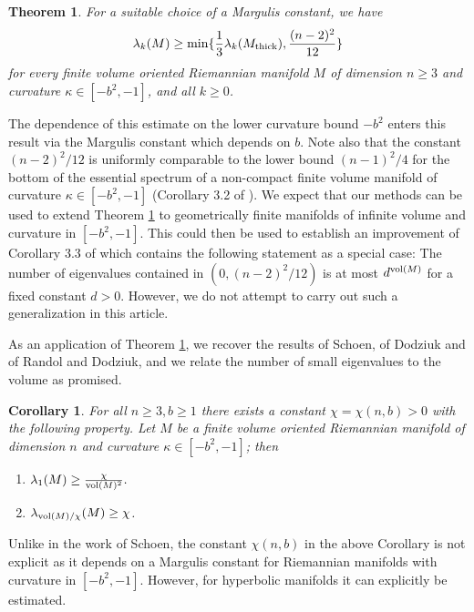 \documentclass[11pt]{amsart}
\theoremstyle{plain}
\theoremstyle{plain}
\newtheorem{thm}{Theorem}
\newtheorem*{cor}{Corollary}
\theoremstyle{definition}
\begin{document}
\begin{thm} \label{thm1}
For a suitable choice of a Margulis constant, we have 
\[\lambda_k(M)\geq \min\{\frac{1}{3}\lambda_k(M_{\rm thick}),\frac{(n-2)^2}{12}\}\]
for every finite volume oriented Riemannian manifold $M$ of dimension
$n\geq 3$ and curvature 
$\kappa\in [-b^2,-1]$, and all $k\geq 0$. 
\end{thm}


The dependence of this estimate 
on the lower curvature bound $-b^2$
enters this result via the Margulis constant which depends on $b$.
Note also that the constant $(n-2)^2/12$ is 
uniformly comparable to
the lower bound $(n-1)^2/4$ for  
the bottom of the essential spectrum of a non-compact
finite volume manifold of curvature $\kappa\in [-b^2,-1]$
(Corollary 3.2 of \cite{H04}). 
We expect that our methods can be used to extend
Theorem \ref{thm1} 
to geometrically finite manifolds of infinite volume and
curvature in $[-b^2,-1]$. This could then be used to establish
an improvement of Corollary 3.3 of \cite{H04} which contains
the following statement as a special case: 
The number of eigenvalues
contained in $(0,(n-2)^2/12)$ is at most $d^{{\rm vol}(M)}$ for a fixed 
constant $d>0$. However, we do not attempt to carry 
out such a generalization in this article. 

As an application of Theorem \ref{thm1}, we recover the results of Schoen, 
of Dodziuk and of Randol and Dodziuk, and we relate 
the number of small 
eigenvalues to the volume 
as promised. 

\begin{cor}\label{application}  
For all $n\geq 3,b\geq 1$ there exists a constant 
$\chi=\chi(n,b)>0$ with the
following property. 
Let $M$ be a finite volume oriented Riemannian 
manifold of dimension $n$ and curvature $\kappa\in [-b^2,-1]$; then 
\begin{enumerate}
\item
$\lambda_1(M)\geq \frac{\chi}{{\rm vol}(M)^2}.$
\item $\lambda_{ {\rm vol}(M)/\chi}(M)\geq \chi$.
\end{enumerate}
\end{cor}




Unlike in the work of Schoen, the constant $\chi(n,b)$ 
in the above Corollary 
is not explicit as it 
depends on a Margulis constant for Riemannian 
manifolds with curvature in $[-b^2,-1]$.
However, for hyperbolic manifolds
it can explicitly be estimated. 
\end{document}
